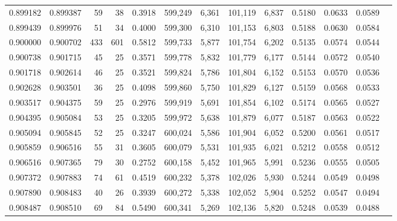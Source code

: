 \begin{tabular}{rrrrrrrrrrrrr}
0.899182 & 0.899387 &    59 &  38 &                                     0.3918 & 599,249 &   6,361 & 101,119 &   6,837 & 0.5180 & 0.0633 & 0.0589 \\
0.899439 & 0.899976 &    51 &  34 &                                     0.4000 & 599,300 &   6,310 & 101,153 &   6,803 & 0.5188 & 0.0630 & 0.0584 \\
0.900000 & 0.900702 &   433 & 601 &                                     0.5812 & 599,733 &   5,877 & 101,754 &   6,202 & 0.5135 & 0.0574 & 0.0544 \\
0.900738 & 0.901715 &    45 &  25 &                                     0.3571 & 599,778 &   5,832 & 101,779 &   6,177 & 0.5144 & 0.0572 & 0.0540 \\
0.901718 & 0.902614 &    46 &  25 &                                     0.3521 & 599,824 &   5,786 & 101,804 &   6,152 & 0.5153 & 0.0570 & 0.0536 \\
0.902628 & 0.903501 &    36 &  25 &                                     0.4098 & 599,860 &   5,750 & 101,829 &   6,127 & 0.5159 & 0.0568 & 0.0533 \\
0.903517 & 0.904375 &    59 &  25 &                                     0.2976 & 599,919 &   5,691 & 101,854 &   6,102 & 0.5174 & 0.0565 & 0.0527 \\
0.904395 & 0.905084 &    53 &  25 &                                     0.3205 & 599,972 &   5,638 & 101,879 &   6,077 & 0.5187 & 0.0563 & 0.0522 \\
0.905094 & 0.905845 &    52 &  25 &                                     0.3247 & 600,024 &   5,586 & 101,904 &   6,052 & 0.5200 & 0.0561 & 0.0517 \\
0.905859 & 0.906516 &    55 &  31 &                                     0.3605 & 600,079 &   5,531 & 101,935 &   6,021 & 0.5212 & 0.0558 & 0.0512 \\
0.906516 & 0.907365 &    79 &  30 &                                     0.2752 & 600,158 &   5,452 & 101,965 &   5,991 & 0.5236 & 0.0555 & 0.0505 \\
0.907372 & 0.907883 &    74 &  61 &                                     0.4519 & 600,232 &   5,378 & 102,026 &   5,930 & 0.5244 & 0.0549 & 0.0498 \\
0.907890 & 0.908483 &    40 &  26 &                                     0.3939 & 600,272 &   5,338 & 102,052 &   5,904 & 0.5252 & 0.0547 & 0.0494 \\
0.908487 & 0.908510 &    69 &  84 &                                     0.5490 & 600,341 &   5,269 & 102,136 &   5,820 & 0.5248 & 0.0539 & 0.0488 \\

\end{tabular}
